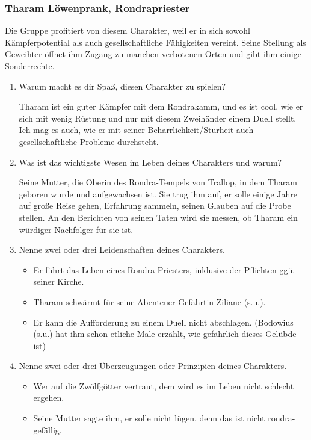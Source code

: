\subsubsection{Tharam Löwenprank, Rondrapriester}
Die Gruppe profitiert von diesem Charakter, weil er in sich sowohl Kämpferpotential als auch gesellschaftliche Fähigkeiten vereint. Seine Stellung als Geweihter öffnet ihm Zugang zu manchen verbotenen Orten und gibt ihm einige Sonderrechte.
 
\begin{enumerate}
  \item Warum macht es dir Spaß, diesen Charakter zu spielen?

Tharam ist ein guter Kämpfer mit dem Rondrakamm, und es ist cool, wie er sich mit wenig Rüstung und nur mit diesem Zweihänder einem Duell stellt. Ich mag es auch, wie er mit seiner Beharrlichkeit/Sturheit auch gesellschaftliche Probleme durchsteht.

  \item Was ist das wichtigste Wesen im Leben deines Charakters und warum?

Seine Mutter, die Oberin des Rondra-Tempels von Trallop, in dem Tharam geboren wurde und aufgewachsen ist. Sie trug ihm auf, er solle einige Jahre auf große Reise gehen, Erfahrung sammeln, seinen Glauben auf die Probe stellen. An den Berichten von seinen Taten wird sie messen, ob Tharam ein würdiger Nachfolger für sie ist.

  \item Nenne zwei oder drei Leidenschaften deines Charakters.

  \begin{itemize}
    \item  Er führt das Leben eines Rondra-Priesters, inklusive der Pflichten ggü. seiner Kirche.

    \item  Tharam schwärmt für seine Abenteuer-Gefährtin Ziliane (s.u.).

    \item Er kann die Aufforderung zu einem Duell nicht abschlagen. (Bodowius (s.u.) hat ihm schon etliche Male erzählt, wie gefährlich dieses Gelübde ist)
  \end{itemize}

  \item Nenne zwei oder drei Überzeugungen oder Prinzipien deines Charakters.

    \begin{itemize}
      \item Wer auf die Zwölfgötter vertraut, dem wird es im Leben nicht schlecht ergehen.
      \item Seine Mutter sagte ihm, er solle nicht lügen, denn das ist nicht rondra-gefällig.
    \end{itemize}

\end{enumerate}



